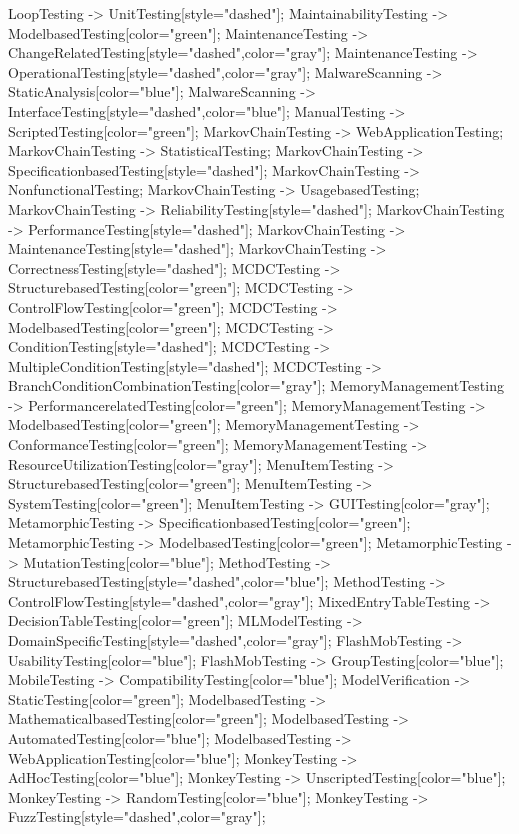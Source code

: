 \documentclass{article}
\begin{document}
{LoopTesting -> UnitTesting[style="dashed"];
MaintainabilityTesting -> ModelbasedTesting[color="green"];
MaintenanceTesting -> ChangeRelatedTesting[style="dashed",color="gray"];
MaintenanceTesting -> OperationalTesting[style="dashed",color="gray"];
MalwareScanning -> StaticAnalysis[color="blue"];
MalwareScanning -> InterfaceTesting[style="dashed",color="blue"];
ManualTesting -> ScriptedTesting[color="green"];
MarkovChainTesting -> WebApplicationTesting;
MarkovChainTesting -> StatisticalTesting;
MarkovChainTesting -> SpecificationbasedTesting[style="dashed"];
MarkovChainTesting -> NonfunctionalTesting;
MarkovChainTesting -> UsagebasedTesting;
MarkovChainTesting -> ReliabilityTesting[style="dashed"];
MarkovChainTesting -> PerformanceTesting[style="dashed"];
MarkovChainTesting -> MaintenanceTesting[style="dashed"];
MarkovChainTesting -> CorrectnessTesting[style="dashed"];
MCDCTesting -> StructurebasedTesting[color="green"];
MCDCTesting -> ControlFlowTesting[color="green"];
MCDCTesting -> ModelbasedTesting[color="green"];
MCDCTesting -> ConditionTesting[style="dashed"];
MCDCTesting -> MultipleConditionTesting[style="dashed"];
MCDCTesting -> BranchConditionCombinationTesting[color="gray"];
MemoryManagementTesting -> PerformancerelatedTesting[color="green"];
MemoryManagementTesting -> ModelbasedTesting[color="green"];
MemoryManagementTesting -> ConformanceTesting[color="green"];
MemoryManagementTesting -> ResourceUtilizationTesting[color="gray"];
MenuItemTesting -> StructurebasedTesting[color="green"];
MenuItemTesting -> SystemTesting[color="green"];
MenuItemTesting -> GUITesting[color="gray"];
MetamorphicTesting -> SpecificationbasedTesting[color="green"];
MetamorphicTesting -> ModelbasedTesting[color="green"];
MetamorphicTesting -> MutationTesting[color="blue"];
MethodTesting -> StructurebasedTesting[style="dashed",color="blue"];
MethodTesting -> ControlFlowTesting[style="dashed",color="gray"];
MixedEntryTableTesting -> DecisionTableTesting[color="green"];
MLModelTesting -> DomainSpecificTesting[style="dashed",color="gray"];
FlashMobTesting -> UsabilityTesting[color="blue"];
FlashMobTesting -> GroupTesting[color="blue"];
MobileTesting -> CompatibilityTesting[color="blue"];
ModelVerification -> StaticTesting[color="green"];
ModelbasedTesting -> MathematicalbasedTesting[color="green"];
ModelbasedTesting -> AutomatedTesting[color="blue"];
ModelbasedTesting -> WebApplicationTesting[color="blue"];
MonkeyTesting -> AdHocTesting[color="blue"];
MonkeyTesting -> UnscriptedTesting[color="blue"];
MonkeyTesting -> RandomTesting[color="blue"];
MonkeyTesting -> FuzzTesting[style="dashed",color="gray"];
}
\end{document}
